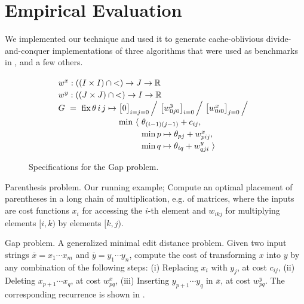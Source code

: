 \section{Empirical Evaluation}
\label{evaluation}

We implemented our technique and used it to generate ca\-che-oblivious
divide-and-conquer implementations of three algorithms that were used as
benchmarks in \cite{IPDPS15/Tithi}, and a few others.

\begin{figure}[t!]
\vspace{-5mm}
\[
  \renewcommand\arraystretch{1.2}
  \begin{array}{@{}l@{}l@{}l@{}}
    \lspan3{w^x : ((I\times I)\cap{<})\to J\to\R} \\
    \lspan3{w^y : ((J\times J)\cap{<})\to I\to\R} \\
    G ~=~ \fix \theta\,i\,j\mapsto{}
      & \lspan2{\big[0\big]_{i=j=0} \,\Big/~ \big[w^y_{0j0}\big]_{i=0} \,\Big/~ \big[w^x_{0i0}\big]_{j=0} \,\Big/} \\
      & \min~\langle~ & \theta_{(i-1)(j-1)}+c_{ij}, \\
      & & \min p\mapsto\theta_{pj}+w^x_{pij}, \\
      & & \min q\mapsto\theta_{iq}+w^y_{qji} ~\rangle
  \end{array}
\]
\vspace{-3mm}
\caption{\label{evaluation:gap spec}
  Specifications for the Gap problem.}
\end{figure}

\begin{paragraph}{Parenthesis problem.} Our running example; Compute
an optimal placement of parentheses in a long chain of multiplication, e.g. of matrices, where the inputs
are cost functions $x_i$ for accessing the $i$-th element and
$w_{ikj}$ for multiplying elements $[i,k)$ by elements $[k,j)$.
\end{paragraph}

\begin{paragraph}{Gap problem.}
A generalized minimal edit distance problem. Given two input strings 
$\overline{x}=x_1\cdots x_m$ and $\overline{y}=y_1\cdots y_n$,
compute the cost of transforming $x$ into $y$ by any combination of the
following steps:
  (i) Replacing $x_i$ with $y_j$, at cost $c_{ij}$,
  (ii) Deleting $x_{p+1}\cdots x_q$, at cost $w^x_{pq}$,
  (iii) Inserting $y_{p+1}\cdots y_q$ in $\overline{x}$, at cost $w^y_{pq}$.
The corresponding recurrence is shown in .
\end{paragraph}


